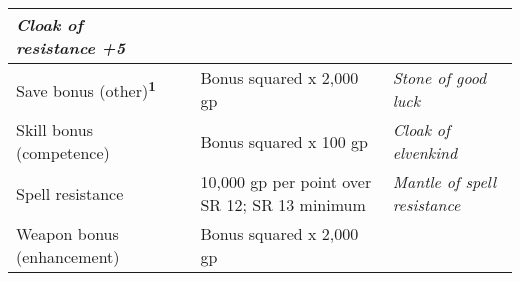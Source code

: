 \begin{longtable}{llllll}
{\begin{minipage}[t]{1.628in}
\textit{Cloak of resistance +5}\end{minipage}}\\
\hline
\multicolumn{4}{p{1.366in}|}{\begin{minipage}[t]{1.366in}\raggedright
Save bonus (other)\textsuperscript{\textbf{1}}\textbf{ }\end{minipage}} & \multicolumn{1}{|p{1.506in}|}{\begin{minipage}[t]{1.506in}\raggedright
Bonus squared  x 2,000 gp \end{minipage}} & \multicolumn{1}{p{1.628in}|}{\begin{minipage}[t]{1.628in}\raggedright
\textit{Stone of good luck}\end{minipage}}\\
\hline
\multicolumn{4}{p{1.366in}|}{\begin{minipage}[t]{1.366in}\raggedright
Skill bonus (competence) \end{minipage}} & \multicolumn{1}{|p{1.506in}|}{\begin{minipage}[t]{1.506in}\raggedright
Bonus squared  x 100 gp \end{minipage}} & \multicolumn{1}{p{1.628in}|}{\begin{minipage}[t]{1.628in}\raggedright
\textit{Cloak of elvenkind}\end{minipage}}\\
\hline
\multicolumn{4}{p{1.366in}|}{\begin{minipage}[t]{1.366in}\raggedright
Spell resistance \end{minipage}} & \multicolumn{1}{|p{1.506in}|}{\begin{minipage}[t]{1.506in}\raggedright
10,000 gp per point over SR 12; \linebreak
SR 13 minimum \end{minipage}} & \multicolumn{1}{p{1.628in}|}{\begin{minipage}[t]{1.628in}\raggedright
\textit{Mantle of spell resistance}\end{minipage}}\\
\hline
\multicolumn{4}{p{1.366in}|}{\begin{minipage}[t]{1.366in}\raggedright
Weapon bonus (enhancement) \end{minipage}} & \multicolumn{1}{|p{1.506in}|}{\begin{minipage}[t]{1.506in}\raggedright
Bonus squared  x 2,000 gp \end{minipage}} & \multicolumn{1}{p{1.628in}|}{\begin{minipage}[t]{1.628in}\raggedright

\end{minipage}}
\end{longtable}
